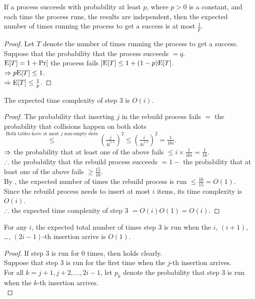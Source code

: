 \begin{pr}
\begin{lm}\label{4a}
If a process succeeds with probability at least $p$, where $p>0$ is a constant, and each time the process runs, the results are independent, then the expected number of times running the process to get a success is at most $\frac1p$.
\begin{proof}
Let $T$ denote the number of times running the process to get a success.\\
Suppose that the probability that the process succeeds $=q$.\\
$\mathrm{E}[T]=1+\mathrm{Pr}[$ the process fails $]\mathrm{E}[T]\leq1+(1-p)\mathrm{E}[T]$.\\
$\Rightarrow p\mathrm{E}[T]\leq1$.\\
$\Rightarrow\mathrm{E}[T]\leq\frac1p$.
\end{proof}
\end{lm}
\begin{lm}\label{4b}
The expected time complexity of step 3 is $O(i)$.
\begin{proof}
The probability that inserting $j$ in the rebuild process fails $=$ the probability that collisions happen on both slots $\overset{\text{Both tables have at most }j\text{ non-empty slots}}\leq(\frac j{4i^{1.5}})^2\leq(\frac i{4i^{1.5}})^2=\frac1{16i}$.\\
$\Rightarrow$ the probability that at least one of the above fails $\leq i\times\frac1{16i}=\frac1{16}$.\\
$\therefore$ the probability that the rebuild process succeeds $=1-$ the probability that at least one of the above fails $\geq\frac{15}{16}$.\\
By , the expected number of times the rebuild process is run $\leq\frac{16}{15}=O(1)$.\\
Since the rebuild process needs to insert at most $i$ items, its time complexity is $O(i)$.\\
$\therefore$ the expected time complexity of step 3 $=O(i)O(1)=O(i)$.
\end{proof}
\end{lm}
\begin{lm}\label{4c}
For any $i$, the expected total number of times step 3 is run when the $i$, $(i+1)$, \dots, $(2i-1)$-th insertion arrive is $O(1)$.
\begin{proof}
If step 3 is run for $0$ times, then  holds clearly.\\
Suppose that step 3 is run for the first time when the $j$-th insertion arrives.\\
For all $k=j+1, j+2, \dots, 2i-1$, let $p_k$ denote the probability that step 3 is run when the $k$-th insertion arrives.\\

\end{proof}
\end{lm}
\end{pr}
